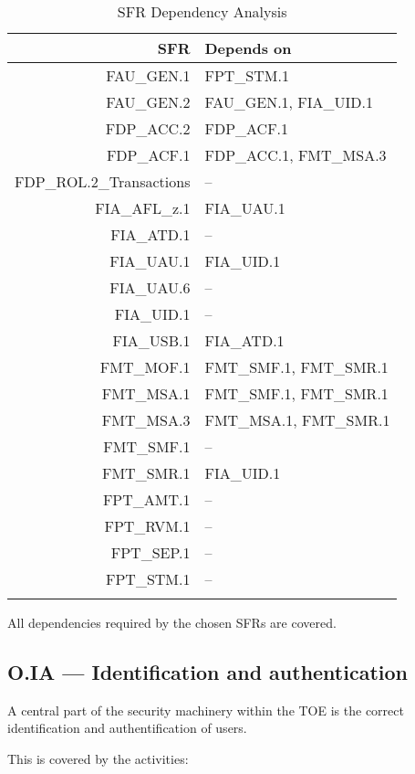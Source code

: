 \documentclass[12pt,english]{scrbook}
\begin{document}
\begin{longtable}{rp{8cm}}
        \toprule
        SFR                 &   Depends on  \\
        \midrule\endhead
FAU\_GEN.1                  &   FPT\_STM.1   \\
FAU\_GEN.2                  &   FAU\_GEN.1, FIA\_UID.1 \\
FDP\_ACC.2                  &   FDP\_ACF.1 \\
FDP\_ACF.1                  &   FDP\_ACC.1, FMT\_MSA.3 \\
FDP\_ROL.2\_Transactions    &   -- \\
FIA\_AFL\_z.1               &   FIA\_UAU.1 \\
FIA\_ATD.1                  &   -- \\
FIA\_UAU.1                  &   FIA\_UID.1 \\
FIA\_UAU.6                  &   -- \\
FIA\_UID.1                  &   -- \\
FIA\_USB.1                  &   FIA\_ATD.1 \\
FMT\_MOF.1                  &   FMT\_SMF.1, FMT\_SMR.1 \\
FMT\_MSA.1                  &   FMT\_SMF.1, FMT\_SMR.1 \\
FMT\_MSA.3                  &   FMT\_MSA.1, FMT\_SMR.1 \\
FMT\_SMF.1                  &   -- \\
FMT\_SMR.1                  &   FIA\_UID.1 \\
FPT\_AMT.1                  &   -- \\
FPT\_RVM.1                  &   -- \\
FPT\_SEP.1                  &   -- \\
FPT\_STM.1                  &   -- \\
\bottomrule
   \caption{SFR Dependency Analysis}
\end{longtable}

All dependencies required by the chosen SFRs are covered. 

\subsection{O.IA --- Identification and authentication}

    A central part of the security machinery within the TOE is the correct
    identification and authentification of users.

    This is covered by the activities:
\end{document}

